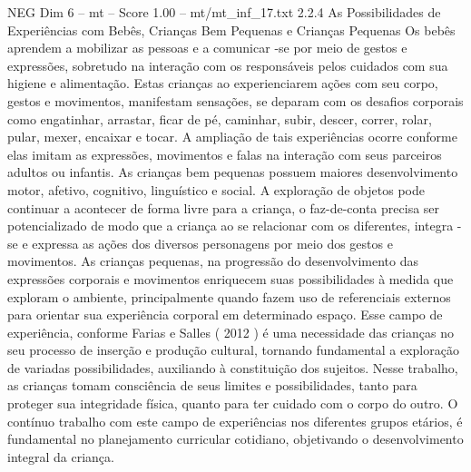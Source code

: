 \begin{textsample}{NEG Dim 6 – mt – Score 1.00 – mt/mt\_inf\_17.txt}  \label{ex:f6_neg_125}
2.2.4 As Possibilidades de Experiências com Bebês, Crianças Bem Pequenas e Crianças Pequenas Os bebês aprendem a mobilizar as pessoas e a comunicar -se por meio de gestos e expressões, sobretudo na interação com os responsáveis pelos cuidados com sua higiene e alimentação.
Estas crianças ao experienciarem ações com seu corpo, gestos e movimentos, manifestam sensações, se deparam com os desafios corporais como engatinhar, arrastar, ficar de pé, caminhar, subir, descer, correr, rolar, pular, mexer, encaixar e tocar.
A ampliação de tais experiências ocorre conforme elas imitam as expressões, movimentos e falas na interação com seus parceiros adultos ou infantis.
As crianças bem pequenas possuem maiores desenvolvimento motor, afetivo, cognitivo, linguístico e social.
A exploração de objetos pode continuar a acontecer de forma livre para a criança, o faz-de-conta precisa ser potencializado de modo que a criança ao se relacionar com os diferentes, integra -se e expressa as ações dos diversos personagens por meio dos gestos e movimentos.
As crianças pequenas, na progressão do desenvolvimento das expressões corporais e movimentos enriquecem suas possibilidades à medida que exploram o ambiente, principalmente quando fazem uso de referenciais externos para orientar sua experiência corporal em determinado espaço.
Esse campo de experiência, conforme Farias e Salles ( 2012 ) é uma necessidade das crianças no seu processo de inserção e produção cultural, tornando fundamental a exploração de variadas possibilidades, auxiliando à constituição dos sujeitos.
Nesse trabalho, as crianças tomam consciência de seus limites e possibilidades, tanto para proteger sua integridade física, quanto para ter cuidado com o corpo do outro.
O contínuo trabalho com este campo de experiências nos diferentes grupos etários, é fundamental no planejamento curricular cotidiano, objetivando o desenvolvimento integral da criança.

\end{textsample}
